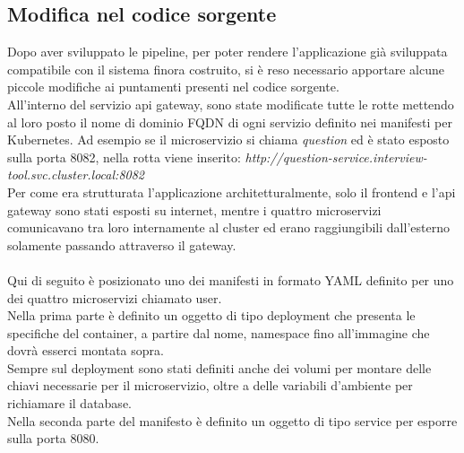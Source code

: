 \documentclass[a4paper,12pt]{report}
\begin{document}
\subsection{Modifica nel codice sorgente}
Dopo aver sviluppato le pipeline, per poter rendere l'applicazione già sviluppata compatibile con il sistema finora costruito, si è reso necessario apportare alcune piccole modifiche ai puntamenti presenti nel codice sorgente.\\
All'interno del servizio api gateway, sono state modificate tutte le rotte mettendo al loro posto il nome di dominio FQDN di ogni servizio definito nei manifesti per Kubernetes. Ad esempio se il microservizio si chiama \textit{question} ed è stato esposto sulla porta 8082, nella rotta viene inserito: \textit{http://question-service.interview-tool.svc.cluster.local:8082}\\
Per come era strutturata l'applicazione architetturalmente, solo il frontend e l'api gateway sono stati esposti su internet, mentre i quattro microservizi comunicavano tra loro internamente al cluster ed erano raggiungibili dall'esterno solamente passando attraverso il gateway.\\ \\
Qui di seguito è posizionato uno dei manifesti in formato YAML definito per uno dei quattro microservizi chiamato user.\\ 
Nella prima parte è definito un oggetto di tipo deployment che presenta le specifiche del container, a partire dal nome, namespace fino all'immagine che dovrà esserci montata sopra.\\ 
Sempre sul deployment sono stati definiti anche dei volumi per montare delle chiavi necessarie per il microservizio, oltre a delle variabili d'ambiente per richiamare il database.\\ 
Nella seconda parte del manifesto è definito un oggetto di tipo service per esporre sulla porta 8080. \\ \\ \\ \\ \\ \\
\end{document}
